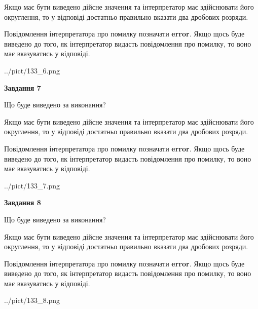 \documentclass[12pt, ukrainian]{article}
\begin{document}
{\begin {Large}
Якщо має бути виведено дійсне значення та інтерпретатор має здійснювати його округлення, 
то у відповіді достатньо правильно вказати два дробових розряди.

Повідомлення інтерпретатора про помилку позначати \textbf{error}.
Якщо щось буде виведено до того, як інтерпретатор видасть повідомлення про помилку, 
то воно має вказуватись у відповіді. \par

\begin{center}
	{../pict/133_6.png}
\end{center}
\newpage

{\begin {center}\textbf{Завдання 7}\end {center}}\par
Що буде виведено за виконання? \par

Якщо має бути виведено дійсне значення та інтерпретатор має здійснювати його округлення, 
то у відповіді достатньо правильно вказати два дробових розряди.

Повідомлення інтерпретатора про помилку позначати \textbf{error}.
Якщо щось буде виведено до того, як інтерпретатор видасть повідомлення про помилку, 
то воно має вказуватись у відповіді. \par

\begin{center}
	{../pict/133_7.png}
\end{center}
\newpage

{\begin {center}\textbf{Завдання 8}\end {center}}\par
Що буде виведено за виконання? \par

Якщо має бути виведено дійсне значення та інтерпретатор має здійснювати його округлення, 
то у відповіді достатньо правильно вказати два дробових розряди.

Повідомлення інтерпретатора про помилку позначати \textbf{error}.
Якщо щось буде виведено до того, як інтерпретатор видасть повідомлення про помилку, 
то воно має вказуватись у відповіді. \par

\begin{center}
	{../pict/133_8.png}
\end{center}
\newpage


\end{Large}}
\end{document}
